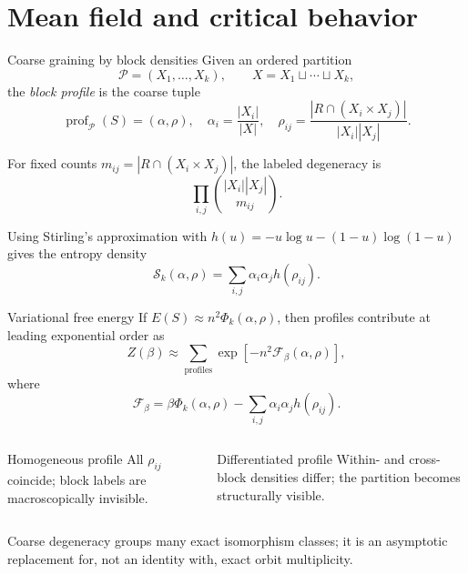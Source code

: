 \section{Mean field and critical behavior}

\begin{frame}{Coarse graining by block densities}
  \small
  Given an ordered partition
  \[
    \mathcal P=(X_1,\ldots,X_k),
    \qquad X=X_1\sqcup\cdots\sqcup X_k,
  \]
  the \emph{block profile} is the coarse tuple
  \[
    \operatorname{prof}_{\mathcal P}(S)=(\alpha,\rho),
    \quad
    \alpha_i=\frac{|X_i|}{|X|},
    \quad
    \rho_{ij}=\frac{|R\cap(X_i\times X_j)|}{|X_i||X_j|}.
  \]

  For fixed counts $m_{ij}=|R\cap(X_i\times X_j)|$, the labeled degeneracy is
  \[
    \prod_{i,j}\binom{|X_i||X_j|}{m_{ij}}.
  \]

  Using Stirling's approximation with
  $h(u)=-u\log u-(1-u)\log(1-u)$ gives the entropy density
  \[
    \mathcal S_k(\alpha,\rho)
      =\sum_{i,j}\alpha_i\alpha_j h(\rho_{ij}).
  \]
\end{frame}

\begin{frame}{Variational free energy}
  If $E(S)\approx n^2\Phi_k(\alpha,\rho)$, then profiles contribute at leading
  exponential order as
  \[
    Z(\beta)\approx
    \sum_{\text{profiles}}
    \exp\!\left[-n^2\mathcal F_\beta(\alpha,\rho)\right],
  \]
  where
  \[
    \boxed{\mathcal F_\beta
      =\beta\Phi_k(\alpha,\rho)
       -\sum_{i,j}\alpha_i\alpha_j h(\rho_{ij}).}
  \]

  \begin{columns}[T]
      \begin{block}{Homogeneous profile}
        All $\rho_{ij}$ coincide; block labels are macroscopically invisible.
      \end{block}
      \begin{block}{Differentiated profile}
        Within- and cross-block densities differ; the partition becomes
        structurally visible.
      \end{block}
  \end{columns}

  {\scriptsize Coarse degeneracy groups many exact isomorphism classes; it is an
  asymptotic replacement for, not an identity with, exact orbit multiplicity.}
\end{frame}

